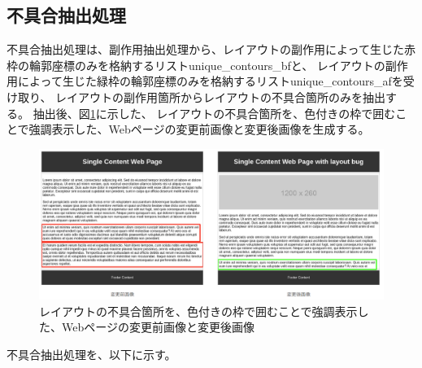\subsection{不具合抽出処理}\label{subsec:Layout_bug_extraction}
不具合抽出処理は、副作用抽出処理から、レイアウトの副作用によって生じた赤枠の輪郭座標のみを格納するリストunique\_contours\_bfと、
レイアウトの副作用によって生じた緑枠の輪郭座標のみを格納するリストunique\_contours\_afを受け取り、
レイアウトの副作用箇所からレイアウトの不具合箇所のみを抽出する。
抽出後、図\ref{fig: img_bug}に示した、
レイアウトの不具合箇所を、色付きの枠で囲むことで強調表示した、Webページの変更前画像と変更後画像を生成する。
\par
\begin{figure}[tp]
    \begin{center}
        \includegraphics[width=1.0\columnwidth]{image/4_img_buf.png}
        \caption{レイアウトの不具合箇所を、色付きの枠で囲むことで強調表示した、Webページの変更前画像と変更後画像}
        \label{fig: img_bug}
    \end{center}
\end{figure}
\par
不具合抽出処理を、以下に示す。
